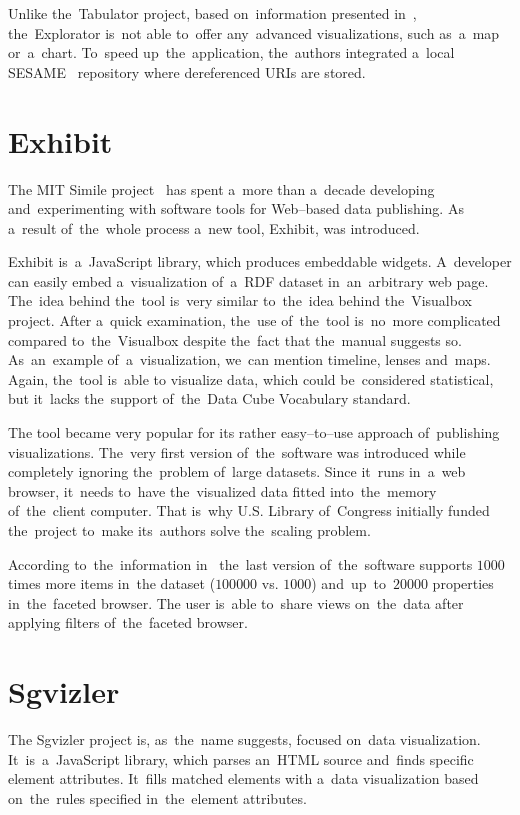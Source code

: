 Unlike the~Tabulator project, based on~information presented in~\cite{explorator},
the~Explorator is~not able to~offer any~advanced visualizations, such as~a~map or~a~chart. To~speed up~the~application, the~authors integrated a~local SESAME~\cite{sesame} 
repository where dereferenced URIs are stored.

\section{Exhibit}
The MIT Simile project~\cite{mit-simile} has spent a~more than a~decade
developing and~experimenting with software tools for Web--based data publishing.
As a~result of~the~whole process a~new tool, Exhibit, was introduced.

Exhibit is~a~JavaScript library, which produces embeddable widgets. A~developer can
easily embed a~visualization of~a~RDF dataset in~an~arbitrary web page. The~idea behind 
the~tool is~very similar to~the~idea behind the~Visualbox project. After a~quick 
examination, the~use of~the~tool is~no~more complicated compared to~the~Visualbox despite the~fact that the~manual suggests so. As~an~example of~a~visualization, we~can mention timeline, lenses and~maps. Again, the~tool is~able 
to visualize data, which could be~considered statistical, but it~lacks the~support of~the~Data Cube Vocabulary standard.

The tool became very popular for its rather easy--to--use 
approach of~publishing visualizations. The~very first version of~the~software
was introduced while completely ignoring the~problem of~large datasets.
Since it~runs in~a~web browser, it~needs to~have the~visualized data
fitted into~the~memory of~the~client 
computer. That is~why U.S. Library of~Congress initially funded the~project to~make its~authors solve the~scaling problem.

According to~the~information in~\cite{exhibit}
the~last version of~the~software supports $1000$ times more items in~the
dataset ($100 000$ vs. $1000$) and~up~to~$20 000$ properties in~the~faceted browser. 
The user is~able to~share views on~the~data after applying filters of~the~faceted browser. 

\section{Sgvizler}
The Sgvizler project is, as~the~name suggests, focused on~data visualization. 
It~is~a~JavaScript library, which parses an~HTML source and~finds specific 
element attributes. It~fills matched elements with a~data visualization based on~the~rules specified in~the~element attributes.

